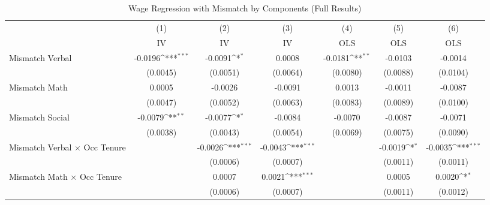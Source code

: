 {
\def\sym#1{\ifmmode^{#1}\else\(^{#1}\)\fi}
\begin{longtable}{l*{6}{c}}
\caption{Wage Regression with Mismatch by Components (Full Results)}\\
\hline  \endfirsthead\hline  \endhead\hline  \endfoot\endlastfoot
                    &\multicolumn{1}{c}{(1)}&\multicolumn{1}{c}{(2)}&\multicolumn{1}{c}{(3)}&\multicolumn{1}{c}{(4)}&\multicolumn{1}{c}{(5)}&\multicolumn{1}{c}{(6)}\\
                    &\multicolumn{1}{c}{IV}&\multicolumn{1}{c}{IV}&\multicolumn{1}{c}{IV}&\multicolumn{1}{c}{OLS}&\multicolumn{1}{c}{OLS}&\multicolumn{1}{c}{OLS}\\
\hline  
Mismatch Verbal     &     -0.0196\sym{***}&     -0.0091\sym{*}  &      0.0008         &     -0.0181\sym{**} &     -0.0103         &     -0.0014         \\
                    &    (0.0045)         &    (0.0051)         &    (0.0064)         &    (0.0080)         &    (0.0088)         &    (0.0104)         \\
Mismatch Math       &      0.0005         &     -0.0026         &     -0.0091         &      0.0013         &     -0.0011         &     -0.0087         \\
                    &    (0.0047)         &    (0.0052)         &    (0.0063)         &    (0.0083)         &    (0.0089)         &    (0.0100)         \\
Mismatch Social     &     -0.0079\sym{**} &     -0.0077\sym{*}  &     -0.0084         &     -0.0070         &     -0.0087         &     -0.0071         \\
                    &    (0.0038)         &    (0.0043)         &    (0.0054)         &    (0.0069)         &    (0.0075)         &    (0.0090)         \\
Mismatch Verbal $\times$ Occ Tenure&                     &     -0.0026\sym{***}&     -0.0043\sym{***}&                     &     -0.0019\sym{*}  &     -0.0035\sym{***}\\
                    &                     &    (0.0006)         &    (0.0007)         &                     &    (0.0011)         &    (0.0011)         \\
Mismatch Math $\times$ Occ Tenure&                     &      0.0007         &      0.0021\sym{***}&                     &      0.0005         &      0.0020\sym{*}  \\
                    &                     &    (0.0006)         &    (0.0007)         &                     &    (0.0011)         &    (0.0012)         \\

\end{longtable}}

